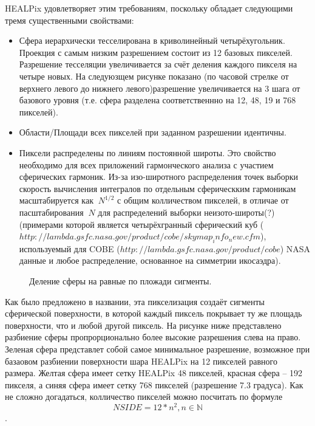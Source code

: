 \documentclass[14pt]{article} %
\begin{document}
HEALPix удовлетворяет этим требованиям, поскольку обладает следующими тремя существенными свойствами:

\begin{itemize}
\item Сфера иерархически тесселирована в криволинейный четырёхугольник. Проекция с самым низким разрешением состоит из 12 базовых пикселей. Разрешение тесселяции увеличивается за счёт деления каждого пикселя на четыре новых. На следуюзщем рисунке показано (по часовой стрелке от верхнего левого до нижнего левого)разрешение увеличивается на 3 шага от базового уровня (т.е. сфера разделена соответственнно на 12, 48, 19 и 768 пикселей).
\item Области/Площади всех пикселей при заданном разрешении идентичны.
\item Пиксели распределены по линиям постоянной широты. Это свойство необходимо для всех приложений гармонческого анализа с участием сферических гармоник. Из-за изо-широтного распределения точек выборки скорость вычисления интегралов по отдельным сферическким гармоникам масштабируется как $~N^{1/2}$ с общим колличеством пикселей, в отличае от пасштабирования $~N$ для распределений выборки неизото-широты(?) (примерами которой является четырёхгранный сферический куб ($http://lambda.gsfc.nasa.gov/product/cobe/skymap_info_new.cfm$), используемый для COBE ($http://lambda.gsfc.nasa.gov/product/cobe$) NASA данные и любое распределение, основанное на симметрии икосаэдра).
\end{itemize}

\begin{figure}[h!]
\caption{Деление сферы на равные по пложади сигменты.}
\label{img:healpix}
\end{figure}

Как было предложено в названии, эта пикселизация создаёт сигменты сферической поверхности, в которой каждый пиксель покрывает ту же площадь поверхности, что и любой другой пиксель. На рисунке ниже представлено разбиение сферы пропрорционально более высокие разрешения слева на право. Зеленая сфера представлет собой самое минимальное разрешение, возможное при базаовом разбиении поверхности шара HEALPix на 12 пикселей равного размера. Желтая сфера имеет сетку HEALPix 48 пикселей, красная сфера -- 192 пикселя, а синяя сфера имеет сетку 768 пикселей (разрешение 7.3 градуса). Как не сложно догадаться, колличество пикселей можно посчитать по формуле $$NSIDE = 12*n^2, n \in \mathbb {N}$$.
\end{document}
